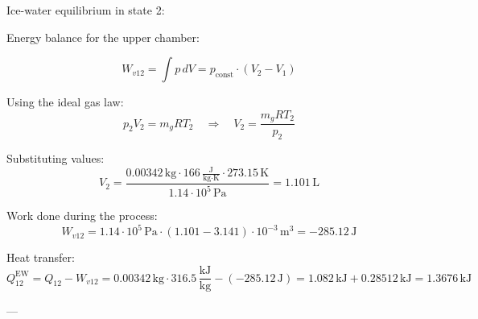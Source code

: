Ice-water equilibrium in state 2:  

Energy balance for the upper chamber:  

\[
W_{v12} = \int p \, dV = p_{\text{const}} \cdot (V_2 - V_1)
\]

Using the ideal gas law:  
\[
p_2 V_2 = m_g R T_2 \quad \Rightarrow \quad V_2 = \frac{m_g R T_2}{p_2}
\]

Substituting values:  
\[
V_2 = \frac{0.00342 \, \text{kg} \cdot 166 \, \frac{\text{J}}{\text{kg·K}} \cdot 273.15 \, \text{K}}{1.14 \cdot 10^5 \, \text{Pa}} = 1.101 \, \text{L}
\]

Work done during the process:  
\[
W_{v12} = 1.14 \cdot 10^5 \, \text{Pa} \cdot (1.101 - 3.141) \cdot 10^{-3} \, \text{m}^3 = -285.12 \, \text{J}
\]

Heat transfer:  
\[
Q_{12}^{\text{EW}} = Q_{12} - W_{v12} = 0.00342 \, \text{kg} \cdot 316.5 \, \frac{\text{kJ}}{\text{kg}} - (-285.12 \, \text{J}) = 1.082 \, \text{kJ} + 0.28512 \, \text{kJ} = 1.3676 \, \text{kJ}
\]

---